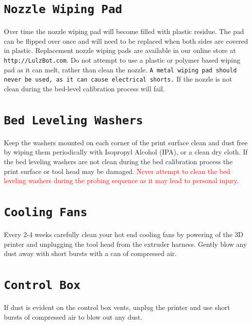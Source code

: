 \section{\texttt{Nozzle Wiping Pad}}
Over time the nozzle wiping pad will become filled with plastic residue. The pad can be flipped over once and will need to be replaced when both sides are covered in plastic. Replacement nozzle wiping pads are available in our online store at \texttt{http://LulzBot.com}. Do not attempt to use a plastic or polymer based wiping pad as it can melt, rather than clean the nozzle. \texttt{A metal wiping pad should never be used, as it can cause electrical shorts.} If the nozzle is not clean during the bed-level calibration process will fail.

\section{\texttt{Bed Leveling Washers}}
Keep the washers mounted on each corner of the print surface clean and dust free by wiping them periodically with Isopropyl Alcohol (IPA), or a clean dry cloth. If the bed leveling washers are not clean during the bed calibration process the print surface or tool head may be damaged. \textcolor{red}{Never attempt to clean the bed leveling washers during the probing sequence as it may lead to personal injury.}

\section{\texttt{Cooling Fans}}
Every 2-4 weeks carefully clean your hot end cooling fans by powering of the 3D printer and unplugging the tool head from the extruder harness. Gently blow any dust away with short bursts with a can of compressed air. 


\section{\texttt{Control Box}}
If dust is evident on the control box vents, unplug the printer and use short bursts of compressed air to blow out any dust.
